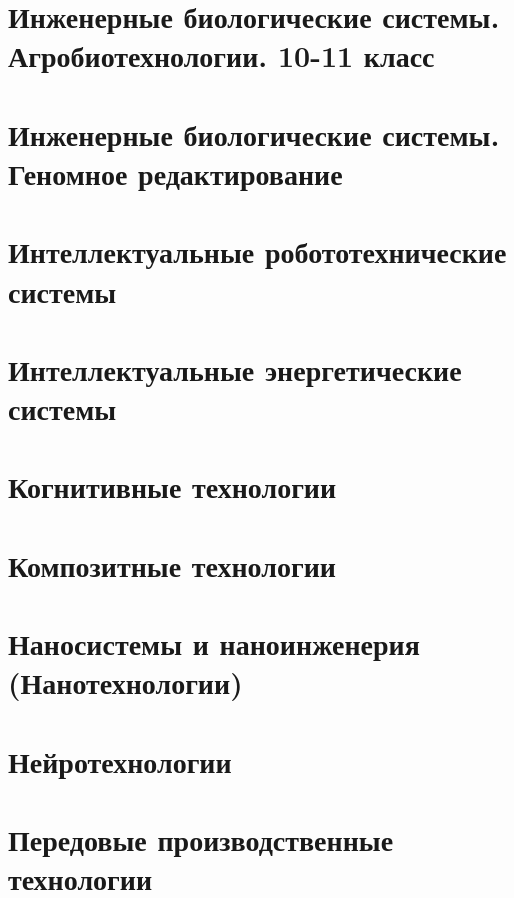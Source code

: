 \chapter{Инженерные биологические системы. Агробиотехнологии. 10-11 класс}


\chapter{Инженерные биологические системы. Геномное редактирование}


\chapter{Интеллектуальные робототехнические системы}


\chapter{Интеллектуальные энергетические системы}


\chapter{Когнитивные технологии}


\chapter{Композитные технологии}


\chapter{Наносистемы и наноинженерия (Нанотехнологии)}


\chapter{Нейротехнологии}


\chapter{Передовые производственные технологии}


